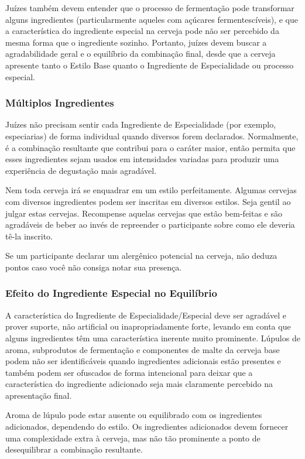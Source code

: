 Juízes também devem entender que o processo de fermentação pode transformar alguns ingredientes (particularmente aqueles com açúcares fermentescíveis), e que a característica do ingrediente especial na cerveja pode não ser percebido da mesma forma que o ingrediente sozinho. Portanto, juízes devem buscar a agradabilidade geral e o equilíbrio da combinação final, desde que a cerveja apresente tanto o Estilo Base quanto o Ingrediente de Especialidade ou processo especial.

\subsubsection*{Múltiplos Ingredientes}
Juízes não precisam sentir cada Ingrediente de Especialidade (por exemplo, especiarias) de forma individual quando diversos forem declarados. Normalmente, é a combinação resultante que contribui para o caráter maior, então permita que esses ingredientes sejam usados em intensidades variadas para produzir uma experiência de degustação mais agradável.

Nem toda cerveja irá se enquadrar em um estilo perfeitamente. Algumas cervejas com diversos ingredientes podem ser inscritas em diversos estilos. Seja gentil ao julgar estas cervejas. Recompense aquelas cervejas que estão bem-feitas e são agradáveis de beber ao invés de repreender o participante sobre como ele deveria tê-la inscrito.

Se um participante declarar um alergênico potencial na cerveja, não deduza pontos caso você não consiga notar sua presença.

\subsubsection*{Efeito do Ingrediente Especial no Equilíbrio}
A característica do Ingrediente de Especialidade/Especial deve ser agradável e prover suporte, não artificial ou inapropriadamente forte, levando em conta que alguns ingredientes têm uma característica inerente muito prominente. Lúpulos de aroma, subprodutos de fermentação e componentes de malte da cerveja base podem não ser identificáveis quando ingredientes adicionais estão presentes e também podem ser ofuscados de forma intencional para deixar que a característica do ingrediente adicionado seja mais claramente percebido na apresentação final.

Aroma de lúpulo pode estar ausente ou equilibrado com os ingredientes adicionados, dependendo do estilo. Os ingredientes adicionados devem fornecer uma complexidade extra à cerveja, mas não tão prominente a ponto de desequilibrar a combinação resultante.
